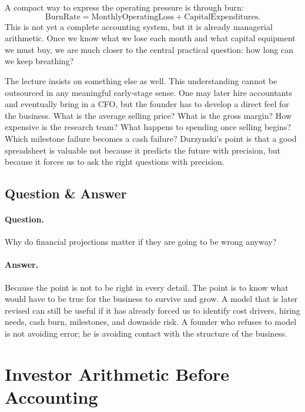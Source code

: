A compact way to express the operating pressure is through burn:
\begin{equation}
\mathrm{BurnRate} = \mathrm{MonthlyOperatingLoss} + \mathrm{CapitalExpenditures}.
\end{equation}
This is not yet a complete accounting system, but it is already managerial arithmetic. Once we know what we lose each month and what capital equipment we must buy, we are much closer to the central practical question: how long can we keep breathing?

The lecture insists on something else as well. This understanding cannot be outsourced in any meaningful early-stage sense. One may later hire accountants and eventually bring in a CFO, but the founder has to develop a direct feel for the business. What is the average selling price? What is the gross margin? How expensive is the research team? What happens to spending once selling begins? Which milestone failure becomes a cash failure? Durzynski's point is that a good spreadsheet is valuable not because it predicts the future with precision, but because it forces us to ask the right questions with precision.

\subsection{Question \& Answer}

\paragraph{Question.}
Why do financial projections matter if they are going to be wrong anyway?

\paragraph{Answer.}
Because the point is not to be right in every detail. The point is to know what would have to be true for the business to survive and grow. A model that is later revised can still be useful if it has already forced us to identify cost drivers, hiring needs, cash burn, milestones, and downside risk. A founder who refuses to model is not avoiding error; he is avoiding contact with the structure of the business.

\section{Investor Arithmetic Before Accounting}

